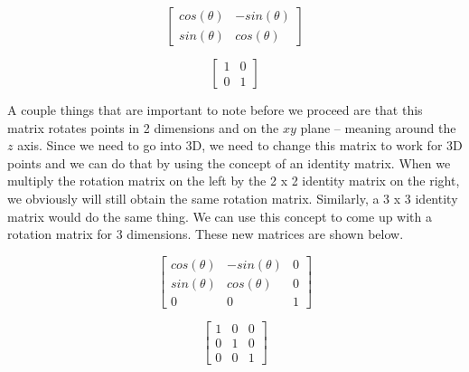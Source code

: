 \documentclass[14pt]{article}
\begin{document}
\begin{figure}[h]
	\begin{center}
		\begin{minipage}[b]{0.45\textwidth}
			\centering
			
			$$
			\begin{bmatrix}
			cos(\theta) & -sin(\theta) \\
			sin(\theta) & cos(\theta)
			\end{bmatrix}
			$$
		\end{minipage}
		\hfill
		\begin{minipage}[b]{0.45\textwidth}
			\centering
			$$
			\begin{bmatrix}
			1 & 0 \\
			0 & 1
			\end{bmatrix}			
			$$
		\end{minipage}
	\end{center}
\end{figure}

A couple things that are important to note before we proceed are that this matrix rotates points in 2 dimensions and on the $xy$ plane -- meaning around the $z$ axis. Since we need to go into 3D, we need to change this matrix to work for 3D points and we can do that by using the concept of an identity matrix. When we multiply the rotation matrix on the left by the 2 x 2 identity matrix on the right, we obviously will still obtain the same rotation matrix. Similarly, a 3 x 3 identity matrix would do the same thing. We can use this concept to come up with a rotation matrix for 3 dimensions. These new matrices are shown below.

\begin{figure}[H]
	\vspace*{1em}
	\begin{center}
		\begin{minipage}[b]{0.45\textwidth}
			\centering
			
			$$
			\begin{bmatrix}
			cos(\theta) & -sin(\theta) & 0 \\
			sin(\theta) & cos(\theta) & 0 \\ 
			0 & 0 & 1
			\end{bmatrix}
			$$
		\end{minipage}
		\hfill
		\begin{minipage}[b]{0.45\textwidth}
			\centering
			$$
			\begin{bmatrix}
			1 & 0 & 0 \\
			0 & 1 & 0 \\
			0 & 0 & 1
			\end{bmatrix}			
			$$
		\end{minipage}
	\end{center}
\end{figure}
\end{document}
